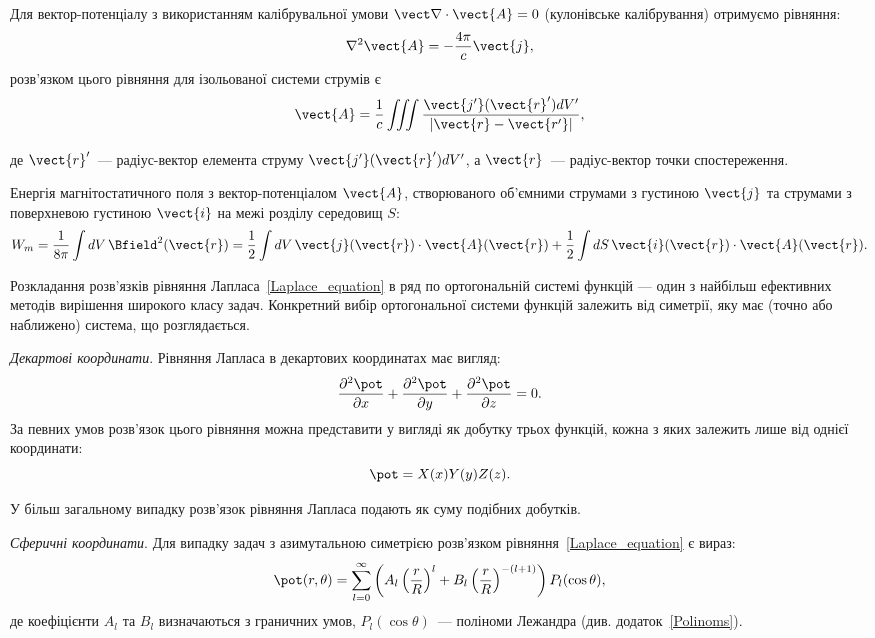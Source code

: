 \begin{Theory}
	Для вектор-потенціалу з використанням калібрувальної умови $\vect\nabla\cdot\vect{A} = 0$ (кулонівське калібрування) отримуємо рівняння:
	\begin{equation}
		\nabla^2\vect{A} = - \frac{4\pi}{c}\vect{j},
	\end{equation}
    розв'язком цього рівняння для ізольованої системи струмів є
	\begin{equation}
		\vect{A} = \frac1c \iiint\limits_{} \frac{\vect{j'}(\vect{r}') dV'}{\left| \vect{r} - \vect{r'} \right|},
	\end{equation}
	де $\vect{r}'$~--- радіус-вектор елемента струму $\vect{j'}(\vect{r}') dV'$, а $\vect{r}$~--- радіус-вектор точки спостереження.

Енергія магнітостатичного поля з вектор-потенціалом $\vect{A}$, створюваного об’ємними струмами з густиною $\vect{j}$ та струмами з поверхневою  густиною $\vect{i}$  на межі розділу середовищ $S$:
\begin{equation}\label{eq:Wm}
    W_m = \frac{1}{{8\pi }}\int dV \,\Bfield^2(\vect{r}) = \frac{1}{2}\int dV \, \vect{j}(\vect{r}) \cdot \vect{A}(\vect{r}) + \frac{1}{2}\int {dS} \, \vect{i}(\vect{r}) \cdot \vect{A}(\vect{r}).
\end{equation}

    \bigskip

	Розкладання розв'язків рівняння Лапласа~\eqref{Laplace_equation} в ряд по ортогональній системі функцій --- один з найбільш ефективних методів вирішення широкого класу задач. Конкретний вибір ортогональної системи функцій залежить від симетрії, яку має (точно або наближено) система, що розглядається.

	\bigskip\textit{Декартові координати}. Рівняння Лапласа в декартових координатах має вигляд:
	\begin{equation}\label{eq:Laplase_eqn_Cartesian}
		\frac{\partial^2\pot}{\partial x} + \frac{\partial^2\pot}{\partial y} + \frac{\partial^2\pot}{\partial z} = 0.
	\end{equation}
	За певних умов розв'язок цього рівняння можна представити у вигляді як добутку трьох функцій, кожна з яких залежить лише від однієї координати:
	\begin{equation*}
		\pot = X(x)Y(y)Z(z).
	\end{equation*}

	У більш загальному випадку розв'язок рівняння Лапласа подають як суму подібних добутків.


	\bigskip\textit{Сферичні координати}. Для випадку задач з азимутальною симетрією розв'язком рівняння~\eqref{Laplace_equation} є вираз:
	\begin{equation}\label{eq:Laplase_Azimuthal}
		\pot(r, \theta) =  \sum\limits_{l = 0}^{\infty} \left(A_l \left( \frac{r}{R}\right)^l + B_l \left( \frac{r}{R}\right)^{-(l+1)} \right) P_l(\cos\theta) ,
	\end{equation}
	де коефіцієнти $A_l$ та $B_l$ визначаються з граничних умов, $P_l(\cos\theta)$~--- поліноми Лежандра (див. додаток~\ref{Polinoms}).


\end{Theory}
